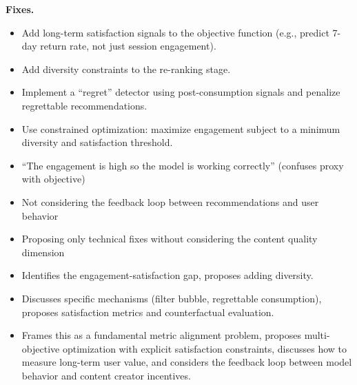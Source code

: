 \begin{interviewq}
\textbf{Fixes.}
\begin{itemize}
    \item Add long-term satisfaction signals to the objective function (e.g., predict 7-day return rate, not just session engagement).
    \item Add diversity constraints to the re-ranking stage.
    \item Implement a ``regret'' detector using post-consumption signals and penalize regrettable recommendations.
    \item Use constrained optimization: maximize engagement subject to a minimum diversity and satisfaction threshold.
\end{itemize}

\redflags
\begin{itemize}
    \item ``The engagement is high so the model is working correctly'' (confuses proxy with objective)
    \item Not considering the feedback loop between recommendations and user behavior
    \item Proposing only technical fixes without considering the content quality dimension
\end{itemize}


\goodgreat
\begin{itemize}
    \item {} Identifies the engagement-satisfaction gap, proposes adding diversity.
    \item {} Discusses specific mechanisms (filter bubble, regrettable consumption), proposes satisfaction metrics and counterfactual evaluation.
    \item {} Frames this as a fundamental metric alignment problem, proposes multi-objective optimization with explicit satisfaction constraints, discusses how to measure long-term user value, and considers the feedback loop between model behavior and content creator incentives.
\end{itemize}

\end{interviewq}

